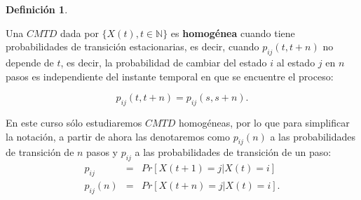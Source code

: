 \documentclass[
]{book}
\newenvironment{yellowbox}{
  \definecolor{shadecolor}{rgb}{210, 180, 140}  
  \color{black}
  \begin{shaded}}
 {\end{shaded}}
\theoremstyle{definition}
\newtheorem{definition}{Definición}[chapter]
\theoremstyle{definition}
\theoremstyle{definition}
\theoremstyle{definition}
\theoremstyle{remark}
\begin{document}
\begin{yellowbox}

\begin{definition}
\protect\hypertarget{def:CMhomogenea}{}\label{def:CMhomogenea}

Una \(CMTD\) dada por \(\{X(t), t \in \mathbb{N}\}\) es \textbf{homogénea} cuando tiene probabilidades de transición estacionarias, es decir, cuando \(p_{ij}(t, t+n)\) no depende de \(t\), es decir, la probabilidad de cambiar del estado \(i\) al estado \(j\) en \(n\) pasos es independiente del instante temporal en que se encuentre el proceso:

\begin{equation*}
p_{ij}(t, t+n) = p_{ij}(s, s+n).
\end{equation*}

\end{definition}

\end{yellowbox}

En este curso sólo estudiaremos \(CMTD\) homogéneas, por lo que para simplificar la notación, a partir de ahora las denotaremos como \(p_{ij}(n)\) a las probabilidades de transición de \(n\) pasos y \(p_{ij}\) a las probabilidades de transición de un paso: \begin{eqnarray*}
p_{ij} &=& Pr[X(t+1) = j | X(t) = i] \\
p_{ij}(n) &=& Pr[X(t+n) = j | X(t) = i].
\end{eqnarray*}
\end{document}
